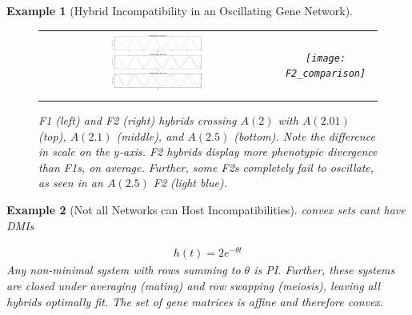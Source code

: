 \documentclass{article}
\newcommand{\1}{\mathbbm{1}}
\newtheorem{example}{Example}
\begin{document}
\begin{example}[Hybrid Incompatibility in an Oscillating Gene Network]
        \begin{figure}[H]
          \centering
          \begin{tabular}{cc}
            \includegraphics[width=0.5\textwidth, height=0.25\paperheight]{F1_comparison} & 
            \texttt{[image: F2\_comparison]}
          \end{tabular}
          \caption{F1 (left) and F2 (right) hybrids crossing $A(2)$ with $A(2.01)$ (top), $A(2.1)$ (middle), and $A(2.5)$ (bottom).
          Note the difference in scale on the $y$-axis. F2 hybrids display more phenotypic divergence than F1s, on average. Further, some F2s completely fail to oscillate, as seen in an $A(2.5)$ F2 (light blue).}
        \end{figure}
    \end{example}
      \begin{example}[Not all Networks can Host Incompatibilities]
        convex sets cant have DMIs

        \begin{align*}
          h(t) = 2 e^{- \theta t}
        \end{align*}
        Any non-minimal system with rows summing to $\theta$ is PI. Further, these systems are closed under averaging (mating) and row swapping (meiosis), leaving all hybrids optimally fit. The set of gene matrices is affine and therefore convex.  
      \end{example}
\end{document}
